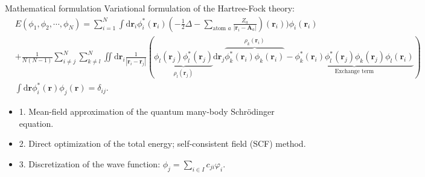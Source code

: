 \documentclass[aspectratio=169]{beamer}
\begin{document}

\begin{frame}{Mathematical formulation}
	Variational formulation of the Hartree-Fock theory:
	\begin{equation*}
		\begin{aligned}
			& E(\phi_1, \phi_2, \cdots, \phi_N) = 
	\sum_{i=1}^N \int\text{d}\mathbf{r}_i
		  \phi_i^*(\mathbf{r}_i) (-\frac{1}{2}\Delta - \sum_{\text{atom } a}
			\frac{Z_a}{|\mathbf{r}_i - \mathbf{A}_a|})(\mathbf{r}_i))
			 \phi_i(\mathbf{r}_i) \\ 
			&+ \frac{1}{N(N - 1)} \sum_{i \neq j}^N \sum_{k \neq l}^N \iint
			\mathrm{d}\mathbf{r}_i
			\frac{1}{|\mathbf{r}_i-\mathbf{r}_j|}
			\left(\underbrace{\phi_l(\mathbf{r}_j)\phi_l^*(\mathbf{r}_j)}_{\rho_l(\mathbf{r}_j)}
			\text{d}\mathbf{r}_j \overbrace{\phi_k^*(\mathbf{r}_i)\phi_k(\mathbf{r}_i)
			}^{\rho_k(\mathbf{r}_i)} - \underbrace{\phi_k^*(\mathbf{r}_i)\phi_l^*(\mathbf{r}_j)
			\phi_k(\mathbf{r}_j)\phi_l(\mathbf{r}_i)}_{\text{Exchange term}}\right)  \\
      & \int\text{d}\mathbf{r}
		  \phi_i^*(\mathbf{r}) \phi_j(\mathbf{r}) = \delta_{ij}.
		\end{aligned}
	\end{equation*}
	\begin{itemize}
		\item 1. Mean-field approximation of the quantum many-body Schr\"odinger equation.
		\item 2. Direct optimization of the total energy; self-consistent field (SCF) method.
		\item 3. Discretization of the wave function: $\phi_j = \sum_{i\in I} c_{ji}\varphi_i$.
	\end{itemize}
\end{frame}
\end{document}
